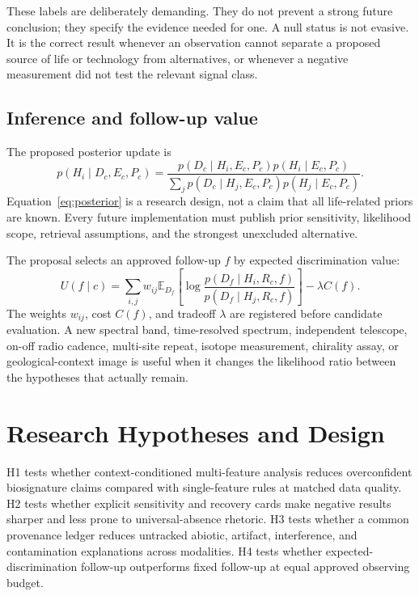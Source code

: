 \documentclass[conference]{IEEEtran}
\begin{document}
These labels are deliberately demanding. They do not prevent a strong future conclusion; they specify the evidence needed for one. A null status is not evasive. It is the correct result whenever an observation cannot separate a proposed source of life or technology from alternatives, or whenever a negative measurement did not test the relevant signal class.

\subsection{Inference and follow-up value}

The proposed posterior update is
\begin{equation}
 p(H_i\mid D_c,E_c,P_c)=
 \frac{p(D_c\mid H_i,E_c,P_c)p(H_i\mid E_c,P_c)}
 {\sum_j p(D_c\mid H_j,E_c,P_c)p(H_j\mid E_c,P_c)}.
\label{eq:posterior}
\end{equation}
Equation~\eqref{eq:posterior} is a research design, not a claim that all life-related priors are known. Every future implementation must publish prior sensitivity, likelihood scope, retrieval assumptions, and the strongest unexcluded alternative.

The proposal selects an approved follow-up \(f\) by expected discrimination value:
\begin{equation}
 U(f\mid c)=\sum_{i,j}w_{ij}\mathbb{E}_{D_f}
 \left[\log\frac{p(D_f\mid H_i,R_c,f)}
 {p(D_f\mid H_j,R_c,f)}\right]-\lambda C(f).
\label{eq:utility}
\end{equation}
The weights \(w_{ij}\), cost \(C(f)\), and tradeoff \(\lambda\) are registered before candidate evaluation. A new spectral band, time-resolved spectrum, independent telescope, on-off radio cadence, multi-site repeat, isotope measurement, chirality assay, or geological-context image is useful when it changes the likelihood ratio between the hypotheses that actually remain.

\section{Research Hypotheses and Design}

H1 tests whether context-conditioned multi-feature analysis reduces overconfident biosignature claims compared with single-feature rules at matched data quality. H2 tests whether explicit sensitivity and recovery cards make negative results sharper and less prone to universal-absence rhetoric. H3 tests whether a common provenance ledger reduces untracked abiotic, artifact, interference, and contamination explanations across modalities. H4 tests whether expected-discrimination follow-up outperforms fixed follow-up at equal approved observing budget.
\end{document}

